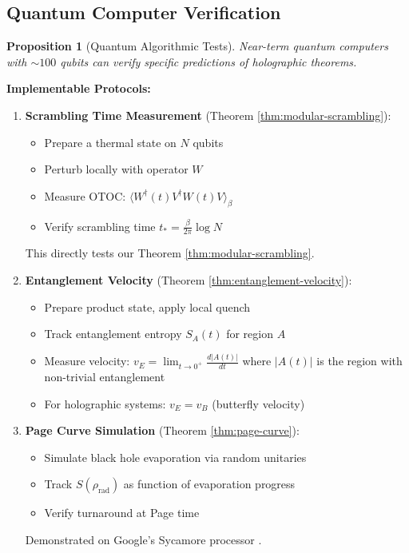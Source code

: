 \documentclass[12pt,a4paper]{article}
\newtheorem{proposition}[theorem]{Proposition}
\begin{document}
\subsection{Quantum Computer Verification}

\begin{proposition}[Quantum Algorithmic Tests]
Near-term quantum computers with $\sim 100$ qubits can verify specific predictions of holographic theorems.
\end{proposition}

\textbf{Implementable Protocols:}
\begin{enumerate}
    \item \textbf{Scrambling Time Measurement} (Theorem \ref{thm:modular-scrambling}):
    \begin{itemize}
        \item Prepare a thermal state on $N$ qubits
        \item Perturb locally with operator $W$
        \item Measure OTOC: $\langle W^\dagger(t) V^\dagger W(t) V \rangle_\beta$
        \item Verify scrambling time $t_* = \frac{\beta}{2\pi} \log N$
    \end{itemize}
    This directly tests our Theorem \ref{thm:modular-scrambling}.
    
    \item \textbf{Entanglement Velocity} (Theorem \ref{thm:entanglement-velocity}):
    \begin{itemize}
        \item Prepare product state, apply local quench
        \item Track entanglement entropy $S_A(t)$ for region $A$
        \item Measure velocity: $v_E = \lim_{t \to 0^+} \frac{d |A(t)|}{dt}$ where $|A(t)|$ is the region with non-trivial entanglement
        \item For holographic systems: $v_E = v_B$ (butterfly velocity)
    \end{itemize}
    
    \item \textbf{Page Curve Simulation} (Theorem \ref{thm:page-curve}):
    \begin{itemize}
        \item Simulate black hole evaporation via random unitaries
        \item Track $S(\rho_{\text{rad}})$ as function of evaporation progress
        \item Verify turnaround at Page time
    \end{itemize}
    Demonstrated on Google's Sycamore processor \cite{almheiri2020}.
    

\end{enumerate}
\end{document}
